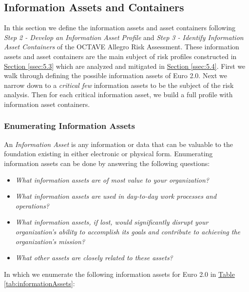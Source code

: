 \documentclass[a4paper,12pt]{article} %
\newcommand{\hypertableref}[1]{\hyperref[#1]{Table \ref{#1}}}
\newcommand{\hypersectionref}[1]{\hyperref[#1]{Section \ref{#1}}}
\begin{document}
{\subsection{Information Assets and Containers} \label{ssec:5.2}

In this section we define the information assets and asset containers following \textit{Step 2 - Develop an Information Asset Profile} and \textit{Step 3 - Identify Information Asset Containers} of the OCTAVE Allegro Risk Assessment. These information assets and asset containers are the main subject of risk profiles constructed in \hypersectionref{ssec:5.3} which are analyzed and mitigated in \hypersectionref{ssec:5.4}. First we walk through defining the possible information assets of Euro 2.0. Next we narrow down to a \textit{critical few} information assets to be the subject of the risk analysis. Then for each critical information asset, we build a full profile with information asset containers.

\subsubsection{Enumerating Information Assets} \label{sssec:5.2:enumeratingAssets}

An \textit{Information Asset} is any information or data that can be valuable to the foundation existing in either electronic or physical form. Enumerating information assets can be done by answering the following questions\cite{CaralliIntroducingOCTAVE2007}:

\begin{itemize}
	\item \textit{What information assets are of most value to your organization?}
	\item \textit{What information assets are used in day-to-day work processes and operations?}
	\item \textit{What information assets, if lost, would significantly disrupt your organization’s ability to accomplish its goals and contribute to achieving the organization’s mission?}
	\item \textit{What other assets are closely related to these assets?}
\end{itemize}

In which we enumerate the following information assets for Euro 2.0 in \hypertableref{tab:informationAssets}:

}
\end{document}
